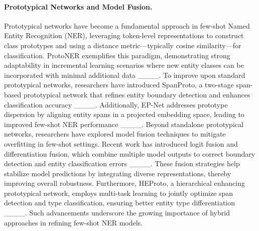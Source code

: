 \paragraph{Prototypical Networks and Model Fusion.}  
Prototypical networks have become a fundamental approach in few-shot Named Entity Recognition (NER), leveraging token-level representations to construct class prototypes and using a distance metric—typically cosine similarity—for classification. ProtoNER exemplifies this paradigm, demonstrating strong adaptability in incremental learning scenarios where new entity classes can be incorporated with minimal additional data ____. To improve upon standard prototypical networks, researchers have introduced SpanProto, a two-stage span-based prototypical network that refines entity boundary detection and enhances classification accuracy ____. Additionally, EP-Net addresses prototype dispersion by aligning entity spans in a projected embedding space, leading to improved few-shot NER performance ____.
Beyond standalone prototypical networks, researchers have explored model fusion techniques to mitigate overfitting in few-shot settings. Recent work has introduced logit fusion and differentiation fusion, which combine multiple model outputs to correct boundary detection and entity classification errors ____. These fusion strategies help stabilize model predictions by integrating diverse representations, thereby improving overall robustness. Furthermore, HEProto, a hierarchical enhancing prototypical network, employs multi-task learning to jointly optimize span detection and type classification, ensuring better entity type differentiation ____. Such advancements underscore the growing importance of hybrid approaches in refining few-shot NER models.

